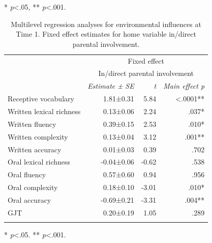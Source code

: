 \documentclass[output=paper,modfonts,nonflat,newtxmath]{langsci/langscibook}
\begin{document}
\begin{paperappendix}
\begin{table}
	* \textit{p}<.05, ** \textit{p}<.001.
\end{table}

\begin{table}
	\caption{\label{tab:pfenninger:16} Multilevel regression analyses for environmental influences at Time 1. Fixed effect estimates for home variable in/direct parental involvement.}
	\begin{tabularx}{0.85\textwidth}{l rrr}
		\lsptoprule
		& \multicolumn{3}{c}{Fixed effect}\\
		& \multicolumn{3}{c}{In/direct parental involvement}\\
		\cmidrule{2-4}
		& \textit{Estimate} \textit{±} \textit{SE} & \textit{t}  & \textit{Main effect p}\\
		\cmidrule{1-4}
		Receptive vocabulary & 1.81±0.31 & 5.84 & <.0001** \\
		Written lexical richness & 0.13±0.06 & 2.24 & .037* \\
		Written fluency & 0.39±0.15 & 2.53 & .010*\\
		Written complexity & 0.13±0.04 & 3.12 & .001**\\
		Written accuracy & 0.01±0.03 & 0.39 & .702\\
		Oral lexical richness & -0.04±0.06 & -0.62 & .538\\
		Oral fluency & 0.57±0.60 & 0.94 & .956\\
		Oral complexity & 0.18±0.10 & -3.01 & .010*\\
		Oral accuracy & -0.69±0.21 & -3.31 & .004**\\
		GJT & 0.20±0.19 & 1.05 & .289\\
		\lspbottomrule
	\end{tabularx}

	* \textit{p}<.05.
	** \textit{p}<.001.
\end{table}



\end{paperappendix}
\end{document}
